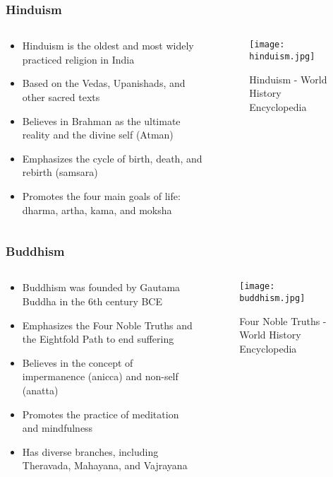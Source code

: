 \begin{frame}[fragile]\frametitle{Hinduism}
\begin{columns}
\begin{column}{0.5\textwidth}
\begin{itemize}
    \item Hinduism is the oldest and most widely practiced religion in India
    \item Based on the Vedas, Upanishads, and other sacred texts
    \item Believes in Brahman as the ultimate reality and the divine self (Atman)
    \item Emphasizes the cycle of birth, death, and rebirth (samsara)
    \item Promotes the four main goals of life: dharma, artha, kama, and moksha
\end{itemize}
\end{column}
\begin{column}{0.5\textwidth}
\begin{figure}
    \texttt{[image: hinduism.jpg]}
    \caption{Hinduism - World History Encyclopedia}
\end{figure}
\end{column}
\end{columns}
\end{frame}

\begin{frame}[fragile]\frametitle{Buddhism}
\begin{columns}
\begin{column}{0.5\textwidth}
\begin{itemize}
    \item Buddhism was founded by Gautama Buddha in the 6th century BCE
    \item Emphasizes the Four Noble Truths and the Eightfold Path to end suffering
    \item Believes in the concept of impermanence (anicca) and non-self (anatta)
    \item Promotes the practice of meditation and mindfulness
    \item Has diverse branches, including Theravada, Mahayana, and Vajrayana
\end{itemize}
\end{column}
\begin{column}{0.5\textwidth}
\begin{figure}
    \texttt{[image: buddhism.jpg]}
    \caption{Four Noble Truths - World History Encyclopedia}
\end{figure}
\end{column}
\end{columns}
\end{frame}

